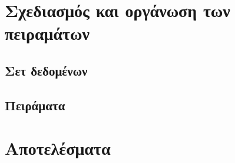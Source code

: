 \section{Σχεδιασμός και οργάνωση των πειραμάτων}
\par
\subsection{Σετ δεδομένων}
\par
\subsection{Πειράματα}
\par
\section{Αποτελέσματα}

